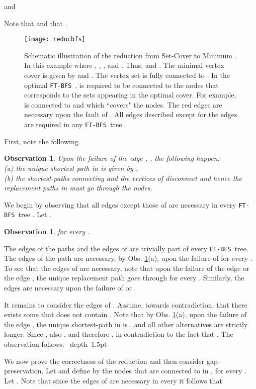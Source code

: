 \documentclass[12pt]{article}
\newtheorem{observation}[theorem]{Observation}
\def\Proof{\par\noindent{\bf Proof:~}}
\def\blackslug{\hbox{\hskip 1pt \vrule width 4pt height 8pt
    depth 1.5pt \hskip 1pt}}
\def\QED{\quad\blackslug\lower 8.5pt\null\par}
\def\FTBFS{\mbox{\tt FT-BFS}}
\begin{document}
and

Note that  and that .

\begin{figure}[ht!]
\begin{center}
\texttt{[image: reducbfs]}
\caption{
\label{fig:reducbfs}
Schematic illustration of the reduction
from Set-Cover to Minimum .
In this example 
where , , ,
 and . Thus,  and .
The minimal vertex cover is given by 
and . The vertex set  is fully connected to .
In the optimal \FTBFS\ ,  is required to be connected to the  nodes that corresponds to the sets appearing in the optimal cover. For example, 
is connected to  and  which ``covers" the  nodes.
The red edges are necessary upon the fault of
. All edges described except for the  edges are required in any
 \FTBFS\ tree. }
\end{center}
\end{figure}

First, note the following.
\begin{observation}
\label{obs:reduc_triv_edges}
Upon the failure of the edge , , the following happen:\\
(a) the unique  shortest path in  is given
by .\\
(b) the shortest-paths connecting  and the vertices of  disconnect and hence the replacement paths in  must go through the  nodes.
\end{observation}
\par We begin by observing that all edges except those of  are necessary in every \FTBFS\ tree .
Let .
\begin{observation}
\label{obs:everyftbfs}
 for every
.
\end{observation}
\Proof
The edges of the paths  and the edges of  are trivially part of every \FTBFS\ tree.
The edges of the path  are necessary, by Obs. \ref{obs:reduc_triv_edges}(a), upon the failure of  for every .
To see that the edges of  are necessary, note
that upon the failure of the edge  or the
edge , the unique  replacement path goes through  for every .
Similarly, the edges  are necessary
upon the failure of  or .
\par It remains to consider the edges of . Assume, towards contradiction, that there exists some  that does not contain .
Note that by Obs. \ref{obs:reduc_triv_edges}(a), upon the failure of the edge , the unique  shortest-path in
 is , and all other alternatives are strictly longer.
Since , also , and therefore
,
in contradiction to the fact that .
The observation follows.
\QED
We now prove the correctness of the reduction and then consider gap-preservation.
Let  and define by 
the  nodes that are connected to  in , for every .
Let .
Note that since the edges of  are necessary in every  it follows that
\end{document}
